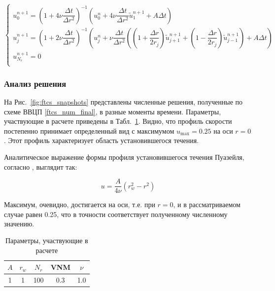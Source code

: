 \begin{equation} \label{alen-chen_num_final_2}
	\begin{cases}
		u_0^{n+1} = \left( 1 + 4 \nu \dfrac{\Delta t}{\Delta r^2} \right)^{-1} \left( u_0^n + 4 \nu \dfrac{\Delta t}{\Delta r^2} \tilde{u}_1^{n+1} + A\Delta t \right) \\
		u_j^{n+1} = \left( 1 + 2 \nu \dfrac{\Delta t}{\Delta r^2} \right)^{-1} \left( u_j^n + \nu \dfrac{\Delta t}{\Delta r^2}
		\left( \left( 1 + \dfrac{\Delta r}{2 r_j} \right) \tilde{u}_{j+1}^{n+1} + \left( 1 - \dfrac{\Delta r}{2 r_j} \right) \tilde{u}_{j-1}^{n+1} \right)  + A \Delta t \right)\\
		u_{N_r}^{n+1} = 0 \\
	\end{cases}
\end{equation}

\subsubsection{Анализ решения}

На Рис.~\ref{fig:ftcs_snapshots} представлены численные решения, полученные по схеме ВВЦП \eqref{ftcs_num_final}, в разные моменты времени. Параметры, участвующие в расчете приведены в Табл.~\ref{tab:parameters_1}. Видно, что профиль скорости постепенно принимает определенный вид с максимумом $u_\text{max} = 0.25$ на оси $r=0$. Этот профиль характеризует область установившегося течения.

Аналитическое выражение формы профиля установившегося течения Пуазейля, согласно \cite{loitsyansky1978}, выглядит так:	

\begin{equation} \label{eq:exact_solution}
	u = \dfrac{A}{4\nu} \left( r_w^2 - r^2 \right)
\end{equation}

Максимум, очевидно, достигается на оси, т.е. при $r=0$, и в рассматриваемом случае равен 0.25, что в точности соответствует полученному численному значению.

\begin{table}[H] 
	\centering
	\begin{tabular}{|c|c|c|c|c|}
		\hline
		\parbox{0cm}{\rule{0pt}{1cm}}$A$ & $r_w$ & $N_r$ & VNM & $\nu$ \\
		\hline
		\parbox{0cm}{\rule{0pt}{1cm}}1 & 1 & 100 & 0.3 & 1.0 \\
		\hline
	\end{tabular}
	\caption{Параметры, участвующие в расчете}
	\label{tab:parameters_1}
\end{table}


